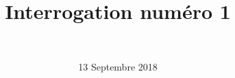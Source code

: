 \documentclass[a4paper,11pt]{exam}
\author{\ }
\date{13 Septembre 2018}
\title{Interrogation num\'ero 1}
\begin{document}
%	

\maketitle



\newpage
\maketitle



\label{LastPage}
\end{document}

